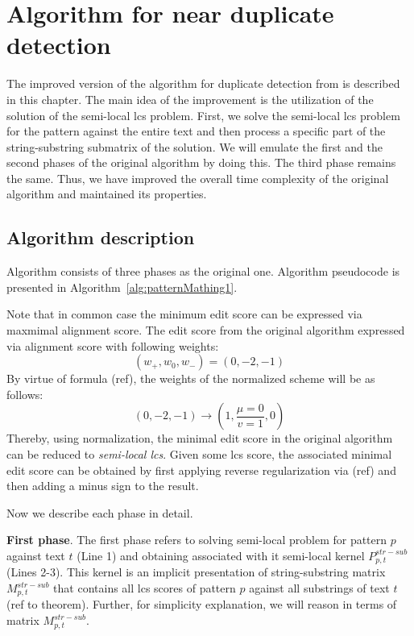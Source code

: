 \section{Algorithm for near duplicate detection}
\label{section:luciv}
The improved version of the algorithm for duplicate detection from 
\cite{luciv2019interactive} is described in this chapter.
The main idea of the improvement is the utilization of the solution of the semi-local lcs problem.
First, we solve the semi-local lcs problem for the pattern against the entire text and then process a specific part of the string-substring submatrix of the solution.
We will emulate the first and the second phases of the original algorithm by doing this. The third phase remains the same.
Thus, we have improved the overall time complexity of the original algorithm and maintained its properties.


\subsection{Algorithm description}
Algorithm consists of three phases as the original one.
Algorithm pseudocode is presented in Algorithm~\ref{alg:patternMathing1}.

Note that in common case  the minimum edit score  can be expressed via maxmimal alignment score. The edit score from the original  algorithm expressed via alignment score with following weights:
\begin{equation}\label{weightAppr}
    (w_{+},w_{0},w_{-}) = (0,-2,-1)
\end{equation}
By virtue of formula (ref), the weights of the normalized scheme will be as follows:
\begin{equation}
    (0, -2, -1) \rightarrow (1,\frac{\mu=0}{v=1}, 0)
\end{equation}
Thereby, using normalization, the minimal edit score in the original algorithm can be reduced to \emph{semi-local lcs}. Given some lcs score, the associated minimal edit score can be obtained by first applying reverse regularization via (ref) and then adding a minus sign to the result.

Now we describe each phase in detail.

\textbf{First phase}. 
The first phase refers to solving semi-local problem for pattern $p$ against text $t$ (Line 1) and obtaining associated with it semi-local kernel $P^{str-sub}_{p,t}$ (Lines 2-3).
This kernel is an implicit presentation of string-substring matrix $M^{str-sub}_{p,t}$ that contains all lcs scores of pattern $p$ against all substrings of text $t$ (ref to theorem).
Further, for simplicity explanation, we will reason in terms of matrix $M^{str-sub}_{p,t}$.

